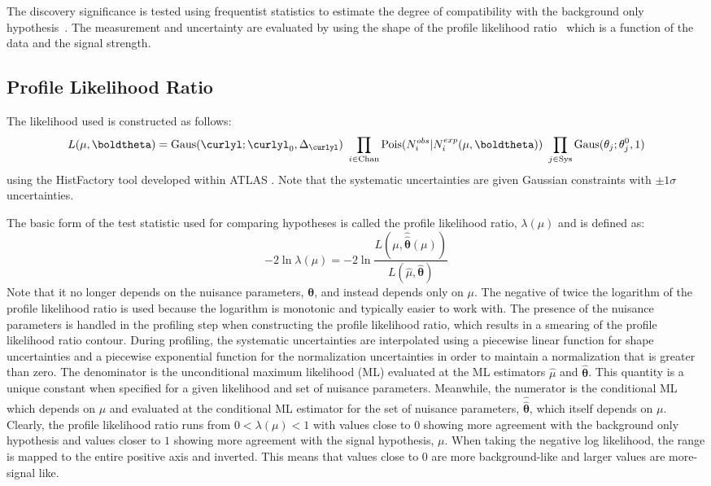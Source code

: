 The discovery significance is tested using frequentist statistics
to estimate the degree of compatibility with the background only hypothesis~\cite{Cowan:1277304}.
The measurement and uncertainty are evaluated 
by using the shape of the profile likelihood ratio~\cite{PDG:2014} 
which is a function of the data and the signal strength.

\subsection{Profile Likelihood Ratio}
\label{sec:profilelhoodratio}

The likelihood used is constructed as follows:
\begin{equation}
L(\mu,\boldtheta) = \mathrm{Gaus}(\curlyl;\curlyl_0,\Delta_{\curlyl})~\prod_{i\in\mathrm{Chan}} \mathrm{Pois}(N_i^{obs}|N_i^{exp}(\mu,\boldtheta))~\prod_{j\in\mathrm{Sys}} \mathrm{Gaus}(\theta_j;\theta_j^0,1)
\label{eq:poisson_likelihood}
\end{equation}
using the HistFactory tool developed within ATLAS \cite{Cranmer:1456844}. Note that the systematic uncertainties are given Gaussian constraints with $\pm1\sigma$ uncertainties.

The basic form of the 
test statistic used for comparing hypotheses is called the profile likelihood 
ratio, $\lambda(\mu)$ and is defined as:
\begin{equation}
-2 \ln \lambda(\mu) = -2 \ln \frac{L(\mu,\hat{\hat{\boldsymbol{\theta}}}(\mu))}{L(\hat{\mu},\hat{\boldsymbol{\theta}})}
\label{eq:profile_likelihood_ratio}
\end{equation}
Note that it no longer depends on the nuisance parameters, $\boldsymbol{\theta}$,
and instead depends only on $\mu$. 
The negative of twice the logarithm of the profile likelihood ratio is used because
the logarithm is monotonic and typically easier to work with.
The presence of the nuisance parameters is handled in the profiling 
step when constructing the profile likelihood ratio,  which results 
in a smearing of the profile likelihood ratio contour. 
During profiling, the systematic uncertainties are
interpolated using a piecewise linear function for shape uncertainties
and a piecewise exponential function for the normalization uncertainties
in order to maintain a normalization that is greater than zero.
The denominator is the 
unconditional maximum likelihood (ML)
evaluated at the ML estimators $\hat{\mu}$ and $\hat{\boldsymbol{\theta}}$.
This quantity is a unique constant when specified for a given likelihood
and set of nuisance parameters.
Meanwhile, the numerator is the conditional ML which depends on $\mu$ and
evaluated at 
the conditional ML estimator for the set of nuisance parameters, 
$\hat{\hat{\boldsymbol{\theta}}}$, which itself depends on $\mu$.
Clearly, the profile likelihood ratio runs from $0 < \lambda(\mu) < 1$
with values close to $0$ showing more agreement with the background only
hypothesis and values closer to $1$ showing more agreement
with the signal hypothesis, $\mu$. 
When taking the negative log likelihood, the range
is mapped to the entire positive axis and inverted. This means
that values close to $0$ are more background-like and larger values are more-signal
like.  

